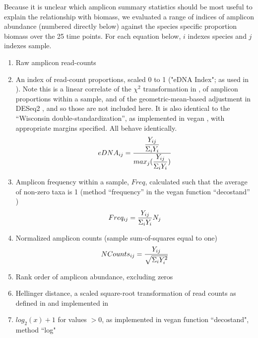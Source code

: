 \documentclass[fleqn,11pt,lineno]{wlscirep}
\begin{document}
Because it is unclear which amplicon summary statistics should be most useful to explain the relationship with biomass, we evaluated a range of indices of amplicon abundance (numbered directly below) against the species specific proportion biomass over the 25 time points.  For each equation below, $i$ indexes species and $j$ indexes sample.

\begin{enumerate}
  \setlength\itemsep{-.1em}
	\item Raw amplicon read-counts
	\item An index of read-count proportions, scaled 0 to 1 ("eDNA Index"; as used in \cite{port2016assessing}). Note this is a linear correlate of the $\chi^2$ transformation in \cite{legendre2001ecologically}, of amplicon proportions within a sample, and of the geometric-mean-based adjustment in DESeq2 \cite{love_moderated_2014}, and so those are not included here. It is also identical to the ``Wisconsin double-standardization'', as implemented in vegan \cite{vegan}, with appropriate margins specified. All behave identically.
	\begin{equation}
		$$eDNA_{ij} = \dfrac{\dfrac{Y_{ij}}{\Sigma_i Y_i}}{max_{j}(\dfrac{Y_{ij}}{\Sigma_i Y_i})}$$ 
	\end{equation}
			 
	\item Amplicon frequency within a sample, $Freq$, calculated such that the average of non-zero taxa is 1 (method ``frequency'' in the vegan function ``decostand'' \cite{vegan, oksanen1983ordination})
\begin{equation}
	$$Freq_{ij} = \dfrac{Y_{ij}}{\Sigma_i Y_i} N_{j}$$
\end{equation}
	\item Normalized amplicon counts (sample sum-of-squares equal to one)
\begin{equation}
	$$NCounts_{ij} = \dfrac{Y_{ij}}{\sqrt{\Sigma_i Y_i ^{ 2}}}$$
\end{equation}
	\item Rank order of amplicon abundance, excluding zeros
	\item Hellinger distance, a scaled square-root transformation of read counts as defined in \cite{legendre2001ecologically} and implemented in \cite{vegan}
	\item $log_2(x) + 1$ for values $>0$, as implemented in vegan function ``decostand", method ``log" \cite{vegan}
\end{enumerate}
\end{document}
